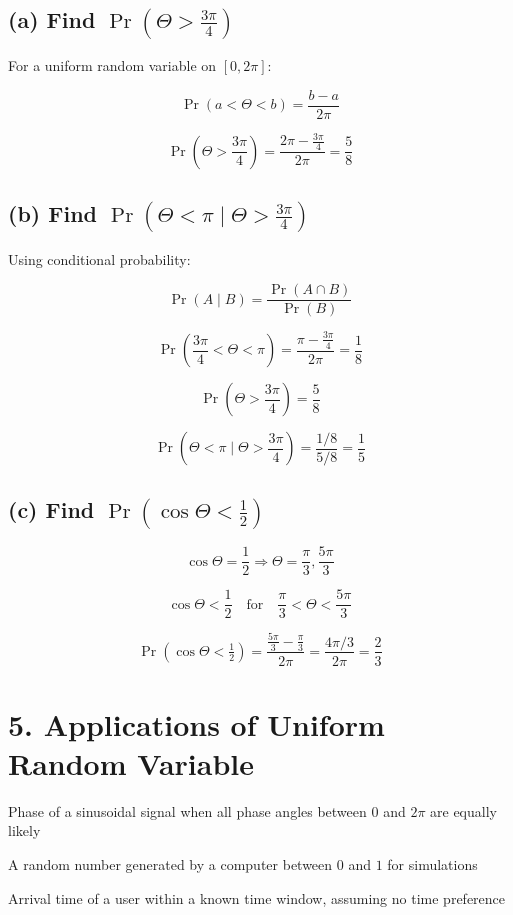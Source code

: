 \documentclass[12pt]{article}
\begin{document}
\subsection*{(a) Find $\Pr(\Theta > \frac{3\pi}{4})$}

For a uniform random variable on $[0,2\pi]$:

\[
\Pr(a < \Theta < b) = \dfrac{b-a}{2\pi}
\]

\[
\Pr\left(\Theta > \frac{3\pi}{4}\right)
= \dfrac{2\pi - \frac{3\pi}{4}}{2\pi}
= \dfrac{5}{8}
\]

\subsection*{(b) Find $\Pr(\Theta < \pi \mid \Theta > \frac{3\pi}{4})$}

Using conditional probability:

\[
\Pr(A \mid B) = \dfrac{\Pr(A \cap B)}{\Pr(B)}
\]

\[
\Pr\left(\frac{3\pi}{4} < \Theta < \pi\right)
= \dfrac{\pi - \frac{3\pi}{4}}{2\pi}
= \dfrac{1}{8}
\]

\[
\Pr\left(\Theta > \frac{3\pi}{4}\right) = \dfrac{5}{8}
\]

\[
\Pr\left(\Theta < \pi \mid \Theta > \frac{3\pi}{4}\right)
= \dfrac{1/8}{5/8}
= \dfrac{1}{5}
\]

\subsection*{(c) Find $\Pr(\cos \Theta < \frac{1}{2})$}

\[
\cos \Theta = \frac{1}{2}
\Rightarrow \Theta = \frac{\pi}{3}, \frac{5\pi}{3}
\]

\[
\cos \Theta < \frac{1}{2}
\quad \text{for} \quad
\frac{\pi}{3} < \Theta < \frac{5\pi}{3}
\]

\[
\Pr(\cos \Theta < \tfrac{1}{2})
= \dfrac{\frac{5\pi}{3} - \frac{\pi}{3}}{2\pi}
= \dfrac{4\pi/3}{2\pi}
= \dfrac{2}{3}
\]

\section*{5. Applications of Uniform Random Variable}

Phase of a sinusoidal signal when all phase angles between $0$ and $2\pi$ are equally likely

A random number generated by a computer between $0$ and $1$ for simulations

Arrival time of a user within a known time window, assuming no time preference
\end{document}
